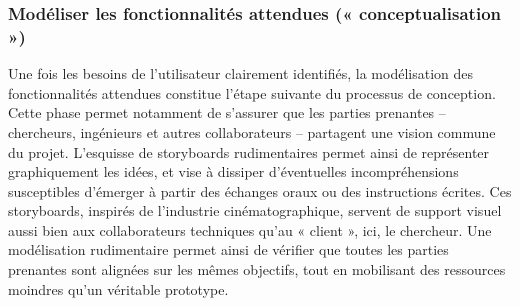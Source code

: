 \subsubsection{Modéliser les fonctionnalités attendues (« conceptualisation »)}

Une fois les besoins de l’utilisateur clairement identifiés, la modélisation des fonctionnalités attendues constitue l’étape suivante du processus de conception. Cette phase permet notamment de s’assurer que les parties prenantes – chercheurs, ingénieurs et autres collaborateurs – partagent une vision commune du projet. L’esquisse de storyboards rudimentaires permet ainsi de représenter graphiquement les idées, et vise à dissiper d’éventuelles incompréhensions susceptibles d’émerger à partir des échanges oraux ou des instructions écrites. Ces storyboards, inspirés de l’industrie cinématographique, servent de support visuel aussi bien aux collaborateurs techniques qu’au « client », ici, le chercheur. Une modélisation rudimentaire permet ainsi de vérifier que toutes les parties prenantes sont alignées sur les mêmes objectifs, tout en mobilisant des ressources moindres qu’un véritable prototype.

